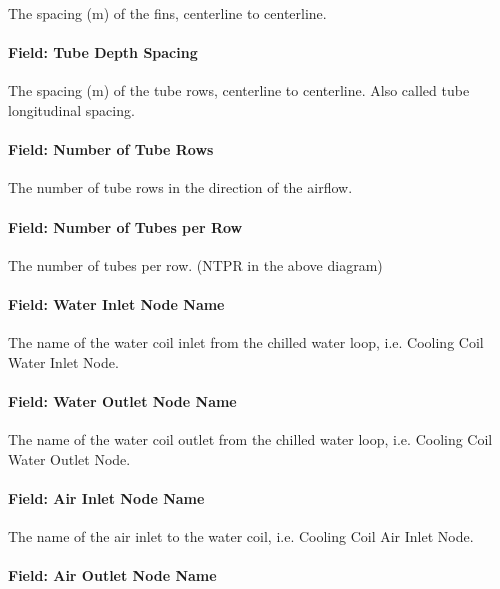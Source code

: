 The spacing (m) of the fins, centerline to centerline.

\paragraph{Field: Tube Depth Spacing}\label{field-tube-depth-spacing}

The spacing (m) of the tube rows, centerline to centerline. Also called tube longitudinal spacing.

\paragraph{Field: Number of Tube Rows}\label{field-number-of-tube-rows}

The number of tube rows in the direction of the airflow.

\paragraph{Field: Number of Tubes per Row}\label{field-number-of-tubes-per-row}

The number of tubes per row. (NTPR in the above diagram)

\paragraph{Field: Water Inlet Node Name}\label{field-water-inlet-node-name-3-000}

The name of the water coil inlet from the chilled water loop, i.e. Cooling Coil Water Inlet Node.

\paragraph{Field: Water Outlet Node Name}\label{field-water-outlet-node-name-3-000}

The name of the water coil outlet from the chilled water loop, i.e. Cooling Coil Water Outlet Node.

\paragraph{Field: Air Inlet Node Name}\label{field-air-inlet-node-name-8}

The name of the air inlet to the water coil, i.e. Cooling Coil Air Inlet Node.

\paragraph{Field: Air Outlet Node Name}\label{field-air-outlet-node-name-8-000}

